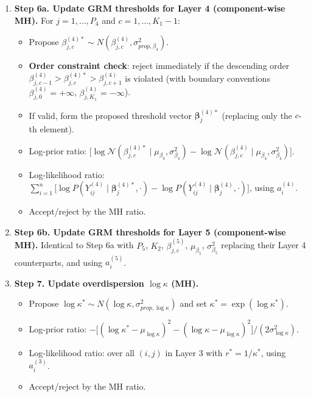 \documentclass[11pt]{article}
\begin{document}
\begin{enumerate}[leftmargin=1.8em]
    \item \textbf{Step 6a. Update GRM thresholds for Layer 4 (component-wise MH).}
    For $j=1,\dots,P_4$ and $c=1,\dots,K_1-1$:
    \begin{itemize}[leftmargin=1.5em]
        \item Propose $\beta_{j,c}^{(4)*}\sim N(\beta_{j,c}^{(4)},\sigma_{prop,\beta_4}^2)$.
        \item \textbf{Order constraint check}: reject immediately if the descending order
        $\beta_{j,c-1}^{(4)} > \beta_{j,c}^{(4)*} > \beta_{j,c+1}^{(4)}$
        is violated (with boundary conventions $\beta_{j,0}^{(4)}=+\infty$, $\beta_{j,K_1}^{(4)}=-\infty$).
        \item If valid, form the proposed threshold vector $\bm{\beta}_j^{(4)*}$ (replacing only the $c$-th element).
        \item Log-prior ratio:
        $\bigl[\log \mathcal{N}(\beta_{j,c}^{(4)*}\mid \mu_{\beta_4},\sigma_{\beta_4}^2) - \log \mathcal{N}(\beta_{j,c}^{(4)}\mid \mu_{\beta_4},\sigma_{\beta_4}^2)\bigr]$.
        \item Log-likelihood ratio:
        $\sum_{i=1}^{n}\bigl[\log P(Y_{ij}^{(4)}\mid \bm{\beta}_j^{(4)*},\cdot) - \log P(Y_{ij}^{(4)}\mid \bm{\beta}_j^{(4)},\cdot)\bigr]$, using $a_i^{(4)}$.
        \item Accept/reject by the MH ratio.
    \end{itemize}

    \item \textbf{Step 6b. Update GRM thresholds for Layer 5 (component-wise MH).}
    Identical to Step 6a with $P_5$, $K_2$, $\beta_{j,c}^{(5)}$, $\mu_{\beta_5}$, $\sigma_{\beta_5}^2$ replacing their Layer 4 counterparts, and using $a_i^{(5)}$.

    \item \textbf{Step 7. Update overdispersion $\log \kappa$ (MH).}
    \begin{itemize}[leftmargin=1.5em]
        \item Propose $\log \kappa^*\sim N(\log \kappa,\sigma_{prop,\log \kappa}^2)$ and set $\kappa^*=\exp(\log \kappa^*)$.
        \item Log-prior ratio:
        $-\bigl[(\log \kappa^*-\mu_{\log \kappa})^2-(\log \kappa-\mu_{\log \kappa})^2\bigr]/(2\sigma_{\log \kappa}^2)$.
        \item Log-likelihood ratio: over all $(i,j)$ in Layer 3 with $r^*=1/\kappa^*$, using $a_i^{(3)}$.
        \item Accept/reject by the MH ratio.
    \end{itemize}


\end{enumerate}
\end{document}
